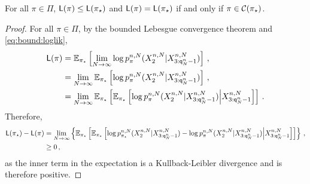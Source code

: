 \begin{proposition}
\label{prop:max:likelihood}
For all $\pi\in\Pi$, $\mathsf{L}(\pi)\le \mathsf{L}(\pi_{\star})$ and $\mathsf{L}(\pi) = \mathsf{L}(\pi_{\star})$ if and only if $\pi\in \mathcal{C}(\pi_{\star})$.
\end{proposition}

\begin{proof}
For all $\pi\in\Pi$, by the bounded Lebesgue convergence theorem and \eqref{eq:bound:loglik},
\begin{align*}
\mathsf{L}(\pi) &= \mathbb{E}_{\pi_{\star}}\left[\lim_{N\to \infty}\log p_{\pi}^{n,N}(X_{2}^{n,N}|X_{3:{\mathsf{q}}^{n}_{N}-1}^{n,N})\right]\,,\\ 
&= \lim_{N\to \infty}\mathbb{E}_{\pi_{\star}}\left[\log p_{\pi}^{n,N}(X_{2}^{n,N}|X_{3:{\mathsf{q}}^{n}_{N}-1}^{n,N})\right]\,,\\
&= \lim_{N\to \infty}\mathbb{E}_{\pi_{\star}}\left[\mathbb{E}_{\pi_{\star}}\left[\log p_{\pi}^{n,N}(X_{2}^{n,N}|X_{3:{\mathsf{q}}^{n}_{N}-1}^{n,N})\middle|X_{3:{\mathsf{q}}^{n}_{N}-1}^{n,N}\right]\right]\,.
\end{align*}
Therefore, 
\begin{align*}
\mathsf{L}(\pi_{\star}) - \mathsf{L}(\pi) &=  \lim_{N\to \infty}\left\{\mathbb{E}_{\pi_{\star}}\left[\mathbb{E}_{\pi_{\star}}\left[\log p_{\pi_{\star}}^{n,N}(X_{2}^{n,N}|X_{3:{\mathsf{q}}^{n}_{N}-1}^{n,N}) - \log p_{\pi}^{n,N}(X_{2}^{n,N}|X_{3:{\mathsf{q}}^{n}_{N}-1}^{n,N})\middle|X_{3:{\mathsf{q}}^{n}_{N}-1}^{n,N}\right]\right]\right\}\,,\\
&\ge 0\,,
\end{align*}
as the inner term in the expectation is a Kullback-Leibler divergence and is therefore positive.
\end{proof}


